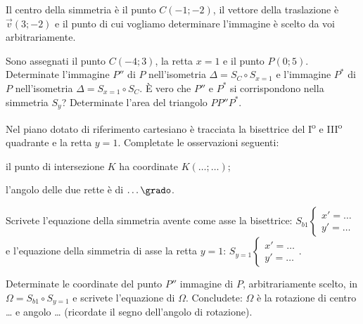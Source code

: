 \begin{esercizio}
	\label{ese:8.64} %
	Il centro della simmetria è il punto \(C(-1;-2)\), il vettore della 
	traslazione è \(\vec{v}(3;-2)\) e il punto di cui vogliamo determinare 
	l'immagine è scelto da voi arbitrariamente. 
\end{esercizio}

\begin{esercizio}
	\label{ese:8.65} %
	Sono assegnati il punto \(C(-4;3)\), la retta \(x=1\) e il punto 
	\(P(0;5)\). Determinate l'immagine \(P''\) di \(P\) nell'isometria 
	\(\Delta=S_{C}\circ S_{x=1}\) e l'immagine \(P^*\) di \(P\) nell'isometria 
	\(\Delta=S_{x=1}\circ S_{C}\). \`E vero che \(P''\) e \(P^*\) si 
	corrispondono nella simmetria \(S_y\)? Determinate l'area del triangolo 
	\(PP''P^*\).
\end{esercizio}

\begin{esercizio}
	\label{ese:8.69} %
	Nel piano dotato di riferimento cartesiano è tracciata la bisettrice 
	del I\textsuperscript{o} e III\textsuperscript{o} quadrante e la 
	retta \(y=1\). Completate le osservazioni seguenti:
	\begin{enumeratea}
		\item il punto di intersezione \(K\) ha coordinate 
		\(K(\ldots{};\ldots{})\);
		\item l'angolo delle due rette è di \(\ldots{}\grado\).
	\end{enumeratea}
\end{esercizio}

\begin{esercizio}
	\label{ese:8.70} %
	Scrivete l'equazione della simmetria avente come asse la bisettrice: 
	\(S_{b1}\begin{cases}x'=\ldots{}\\y'=\ldots{}\end{cases}\) e 
	l'equazione della simmetria di asse la retta \(y=1\): 
	\(S_{y=1}\begin{cases}x'=\ldots{}\\y'=\ldots{}\end{cases}\).
\end{esercizio}

\begin{esercizio}
	\label{ese:8.71} %
	Determinate le coordinate del punto \(P''\) immagine di \(P\), 
	arbitrariamente scelto, in \(\Omega = S_{b1} \circ S_{y=1}\) e scrivete 
	l'equazione di \(\Omega\).
	Concludete: \(\Omega\) è la rotazione di centro \ldots{} e angolo 
	\ldots{} (ricordate il segno dell'angolo di rotazione).
\end{esercizio}

